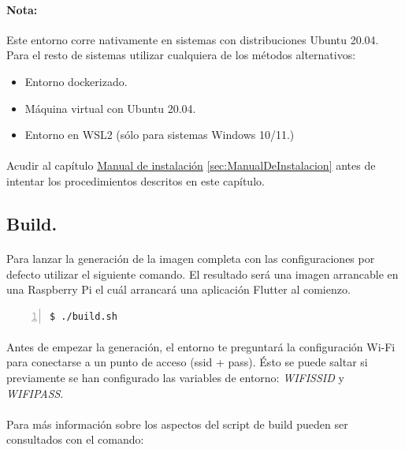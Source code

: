 \paragraph{Nota:} Este entorno corre nativamente en sistemas con distribuciones Ubuntu 20.04.
Para el resto de sistemas utilizar cualquiera de los métodos alternativos:

\begin{itemize}
    \item Entorno dockerizado.
    \item Máquina virtual con Ubuntu 20.04.
    \item Entorno en WSL2 (sólo para sistemas Windows 10/11.)
\end{itemize}

\paragraph{}Acudir al capítulo \hyperref[sec:ManualDeInstalacion]{Manual de instalación}
\ref{sec:ManualDeInstalacion} antes de intentar los procedimientos descritos en este
capítulo.

\subsection{Build.}

\paragraph{}Para lanzar la generación de la imagen completa con las configuraciones por
defecto utilizar el siguiente comando. El resultado será una imagen arrancable en una
Raspberry Pi el cuál arrancará una aplicación Flutter al comienzo.

\begin{lstlisting}[style=consola, numbers=left]
    $ ./build.sh
\end{lstlisting}

\paragraph{}Antes de empezar la generación, el entorno te preguntará la configuración
Wi-Fi para conectarse a un punto de acceso (ssid + pass). Ésto se puede saltar si
previamente se han configurado las variables de entorno: \emph{WIFISSID} y \emph{WIFIPASS}.

\paragraph{}Para más información sobre los aspectos del script de build pueden ser
consultados con el comando:

